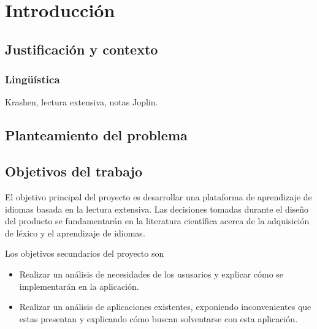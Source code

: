 \newpage{\pagestyle{empty}}
\chapter{Introducción}

\section{Justificación y contexto}

\subsection{Lingüística}

Krashen, lectura extensiva, notas Joplin.

\section{Planteamiento del problema}

\section{Objetivos del trabajo}

El objetivo principal del proyecto es desarrollar una plataforma de aprendizaje de idiomas basada en la lectura extensiva. Las decisiones tomadas durante el diseño del producto se fundamentarán en la literatura científica acerca de la adquisición de léxico y el aprendizaje de idiomas.

Los objetivos secundarios del proyecto son
\begin{itemize}
	\item Realizar un análisis de necesidades de los ususarios y explicar cómo se implementarán en la aplicación.
	\item Realizar un análisis de aplicaciones existentes, exponiendo inconvenientes que estas presentan y explicando cómo buscan solventarse con esta aplicación.
\end{itemize}